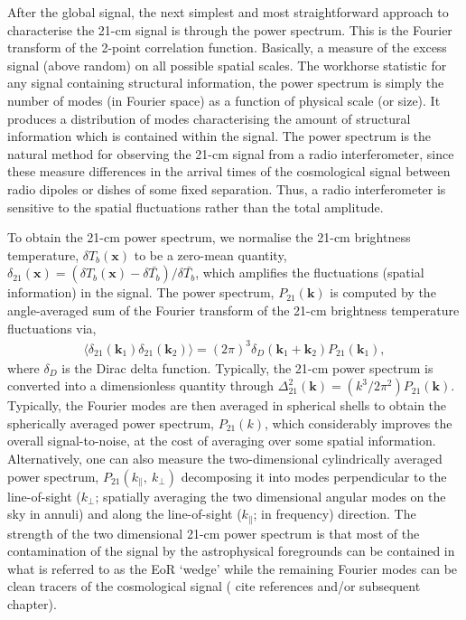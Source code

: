 After the global signal, the next simplest and most straightforward approach to characterise the 21-cm signal is through the power spectrum. This is the Fourier transform of the 2-point correlation function. Basically, a measure of the excess signal (above random) on all possible spatial scales. The workhorse statistic for any signal containing structural information, the power spectrum is simply the number of modes (in Fourier space) as a function of physical scale (or size). It produces a distribution of modes characterising the amount of structural information which is contained within the signal. The power spectrum is the natural method for observing the 21-cm signal from a radio interferometer, since these measure differences in the arrival times of the cosmological signal between radio dipoles or dishes of some fixed separation. Thus, a radio interferometer is sensitive to the spatial fluctuations rather than the total amplitude.

To obtain the 21-cm power spectrum, we normalise the 21-cm brightness temperature, $\delta T_{b}(\mathbf{x})$ to be a zero-mean quantity, $\delta_{21}(\mathbf{x}) = (\delta T_{b}(\mathbf{x}) - \delta\bar{T_{b}})/\delta\bar{T_{b}}$, which amplifies the fluctuations (spatial information) in the signal. The power spectrum, $P_{21}(\mathbf{k})$ is computed by the angle-averaged sum of the Fourier transform of the 21-cm brightness temperature fluctuations via,
\begin{eqnarray}
\langle \delta_{21}(\mathbf{k}_{1})\delta_{21}(\mathbf{k}_{2}) \rangle = (2\pi)^{3}\delta_{D}( \mathbf{k}_{1} + \mathbf{k}_{2})P_{21}(\mathbf{k}_{1}),
\end{eqnarray}
where $\delta_{D}$ is the Dirac delta function. Typically, the 21-cm power spectrum is converted into a dimensionless quantity through $\Delta^{2}_{21}(\mathbf{k}) = (k^{3}/2\pi^{2})P_{21}(\mathbf{k})$. Typically, the Fourier modes are then averaged in spherical shells to obtain the spherically averaged power spectrum, $P_{21}(k)$, which considerably improves the overall signal-to-noise, at the cost of averaging over some spatial information. Alternatively, one can also measure the two-dimensional cylindrically averaged power spectrum, $P_{21}(k_\parallel,~k_\perp)$ decomposing it into modes perpendicular to the line-of-sight ($k_\perp$; spatially averaging the two dimensional angular modes on the sky in annuli) and along the line-of-sight ($k_\parallel$; in frequency) direction. The strength of the two dimensional 21-cm power spectrum is that most of the contamination of the signal by the astrophysical foregrounds can be contained in what is referred to as the EoR `wedge' while the remaining Fourier modes can be clean tracers of the cosmological signal ({\color{red} cite references and/or subsequent chapter}).

